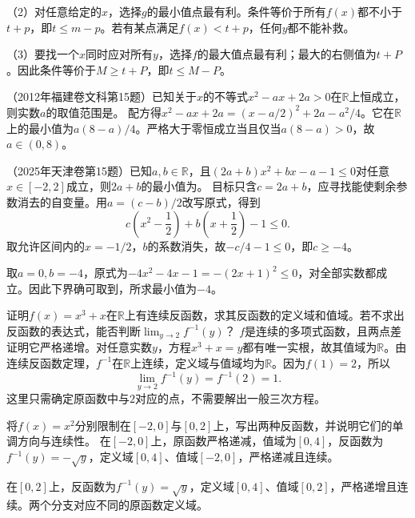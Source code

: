 （2）对任意给定的\(x\)，选择\(g\)的最小值点最有利。条件等价于所有\(f(x)\)都不小于\(t+p\)，即\(t\le m-p\)。若有某点满足\(f(x)<t+p\)，任何\(y\)都不能补救。

（3）要找一个\(x\)同时应对所有\(y\)，选择\(f\)的最大值点最有利；最大的右侧值为\(t+P\)。因此条件等价于\(M\ge t+P\)，即\(t\le M-P\)。


（2012年福建卷文科第15题）已知关于\(x\)的不等式\(x^2-ax+2a>0\)在\(\mathbb R\)上恒成立，则实数\(a\)的取值范围是\underline{\hspace{1.5cm}}。
\solutionanswer
配方得\(x^2-ax+2a=(x-a/2)^2+2a-a^2/4\)。它在\(\mathbb R\)上的最小值为\(a(8-a)/4\)。严格大于零恒成立当且仅当\(a(8-a)>0\)，故\(a\in(0,8)\)。


（2025年天津卷第15题）已知\(a,b\in\mathbb R\)，且\((2a+b)x^2+bx-a-1\le0\)对任意\(x\in[-2,2]\)成立，则\(2a+b\)的最小值为\underline{\hspace{1.2cm}}。
\solutionanswer
目标只含\(c=2a+b\)，应寻找能使剩余参数消去的自变量。用\(a=(c-b)/2\)改写原式，得到
\[
c\left(x^2-\frac12\right)+b\left(x+\frac12\right)-1\le0.
\]
取允许区间内的\(x=-1/2\)，\(b\)的系数消失，故\(-c/4-1\le0\)，即\(c\ge-4\)。

取\(a=0,b=-4\)，原式为\(-4x^2-4x-1=-(2x+1)^2\le0\)，对全部实数都成立。因此下界确可取到，所求最小值为\(\boxed{-4}\)。


证明\(f(x)=x^3+x\)在\(\mathbb R\)上有连续反函数，求其反函数的定义域和值域。若不求出反函数的表达式，能否判断\(\lim_{y\to2}f^{-1}(y)\)？
\solutionanswer
\(f\)是连续的多项式函数，且两点差证明它严格递增。对任意实数\(y\)，方程\(x^3+x=y\)都有唯一实根，故其值域为\(\mathbb R\)。由连续反函数定理，\(f^{-1}\)在\(\mathbb R\)上连续，定义域与值域均为\(\mathbb R\)。因为\(f(1)=2\)，所以
\[
\lim_{y\to2}f^{-1}(y)=f^{-1}(2)=1.
\]
这里只需确定原函数中与\(2\)对应的点，不需要解出一般三次方程。


将\(f(x)=x^2\)分别限制在\([-2,0]\)与\([0,2]\)上，写出两种反函数，并说明它们的单调方向与连续性。
\solutionanswer
在\([-2,0]\)上，原函数严格递减，值域为\([0,4]\)，反函数为\(f^{-1}(y)=-\sqrt y\)，定义域\([0,4]\)、值域\([-2,0]\)，严格递减且连续。

在\([0,2]\)上，反函数为\(f^{-1}(y)=\sqrt y\)，定义域\([0,4]\)、值域\([0,2]\)，严格递增且连续。两个分支对应不同的原函数定义域。


